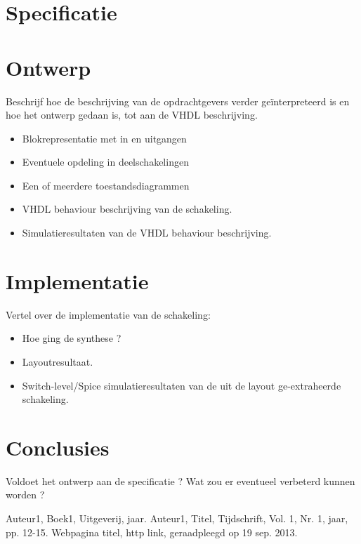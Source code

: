 \documentclass[11pt,twoside,a4paper]{article}
\begin{document}
\section{Specificatie}


\section{Ontwerp}
Beschrijf hoe de beschrijving van de opdrachtgevers verder geïnterpreteerd is en hoe het ontwerp gedaan is, tot aan de VHDL beschrijving.
\begin{itemize}
\item
Blokrepresentatie met in en uitgangen
\item
Eventuele opdeling in deelschakelingen
\item
Een of meerdere toestandsdiagrammen 
\item
VHDL behaviour beschrijving van de schakeling.
\item
Simulatieresultaten van de VHDL behaviour beschrijving.
\end{itemize}

\section{Implementatie}
Vertel over de implementatie van de schakeling:
\begin{itemize}
\item
Hoe ging de synthese ?
\item
Layoutresultaat.
\item
Switch-level/Spice simulatieresultaten van de uit de layout ge-extraheerde schakeling.
\end{itemize}

\section{Conclusies}
Voldoet het ontwerp aan de specificatie ?
Wat zou er eventueel verbeterd kunnen worden ?

\begin{thebibliography}{9}
Auteur1, 
Boek1, 
Uitgeverij, 
jaar.
Auteur1, 
Titel, 
Tijdschrift, 
Vol. 1, 
Nr. 1, 
jaar, 
pp. 12-15.
Webpagina titel, 
http link, 
geraadpleegd op 19 sep. 2013.
\end{thebibliography}
\end{document}
